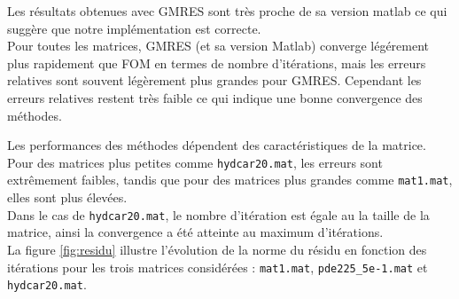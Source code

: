 \documentclass[12pt,a4paper]{article}
\begin{document}
Les résultats obtenues avec GMRES sont très proche de sa version matlab ce qui suggère que notre implémentation est correcte. \\

Pour toutes les matrices, GMRES (et sa version Matlab) converge légérement plus rapidement que FOM en termes de nombre d'itérations, mais les erreurs relatives sont souvent légèrement plus grandes pour GMRES.
Cependant les erreurs relatives restent très faible ce qui indique une bonne convergence des méthodes.

Les performances des méthodes dépendent des caractéristiques de la matrice. \\
Pour des matrices plus petites comme \texttt{hydcar20.mat}, les erreurs sont extrêmement faibles, tandis que pour des matrices plus grandes comme \texttt{mat1.mat}, elles sont plus élevées. \\
Dans le cas de \texttt{hydcar20.mat}, le nombre d'itération est égale au la taille de la matrice, ainsi la convergence a été atteinte au maximum d'itérations. \\

La figure \ref{fig:residu} illustre l'évolution de la norme du résidu en fonction des itérations pour les trois matrices considérées : \texttt{mat1.mat}, \texttt{pde225\_5e-1.mat} et \texttt{hydcar20.mat}.
\end{document}
